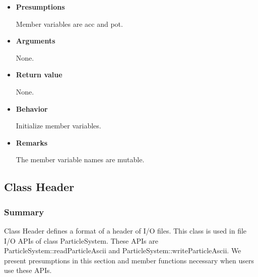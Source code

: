 \begin{itemize}

\item {\bf Presumptions}
  
  Member variables are acc and pot.
  
\item {\bf Arguments}

  None.
  
\item {\bf Return value}

  None.
  
\item {\bf Behavior}

  Initialize member variables.
  
\item {\bf Remarks}

  The member variable names are mutable.

\end{itemize}

\subsection{Class Header}
\label{sec:example_userdefined_header}

\subsubsection{Summary}

Class Header defines a format of a header of I/O files. This class is
used in file I/O APIs of class ParticleSystem. These APIs are
ParticleSystem::readParticleAscii and
ParticleSystem::writeParticleAscii. We present presumptions in this
section and member functions necessary when users use these APIs.

